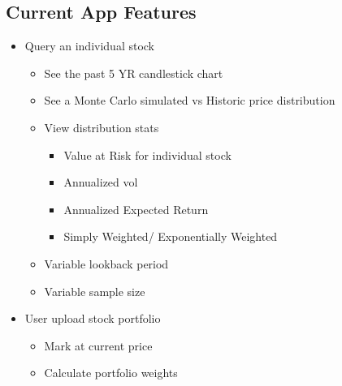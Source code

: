 \documentclass[letterpaper,10pt,english]{sphinxmanual}
\begin{document}
\subsection{Current App Features}
\label{\detokenize{readme:current-app-features}}\begin{itemize}
\item {} 
\sphinxAtStartPar
Query an individual stock
\begin{itemize}
\item {} 
\sphinxAtStartPar
See the past 5 YR candlestick chart

\item {} 
\sphinxAtStartPar
See a Monte Carlo simulated vs Historic price distribution

\item {} 
\sphinxAtStartPar
View distribution stats
\begin{itemize}
\item {} 
\sphinxAtStartPar
Value at Risk for individual stock

\item {} 
\sphinxAtStartPar
Annualized vol

\item {} 
\sphinxAtStartPar
Annualized Expected Return

\item {} 
\sphinxAtStartPar
Simply Weighted/ Exponentially Weighted

\end{itemize}

\item {} 
\sphinxAtStartPar
Variable lookback period

\item {} 
\sphinxAtStartPar
Variable sample size

\end{itemize}

\item {} 
\sphinxAtStartPar
User upload stock portfolio
\begin{itemize}
\item {} 
\sphinxAtStartPar
Mark at current price

\item {} 
\sphinxAtStartPar
Calculate portfolio weights

\end{itemize}

\end{itemize}
\end{document}
